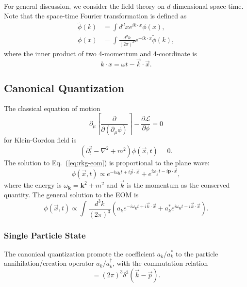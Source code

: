 For general discussion, we consider the field theory on $d$-dimensional space-time.
Note that the space-time Fourier transformation is defined as
\begin{equation}
\begin{aligned}
	\tilde{\phi}(k) &= \int d^{d}x e^{ik\cdot x} \phi(x), \\ 
	\phi(x) &= \int \frac{d^{d}k}{(2\pi)^{d}} e^{-ik\cdot x}\tilde{\phi}(k),
\end{aligned}
\end{equation}
where the inner product of two 4-momentum and 4-coordinate is
\begin{equation}
	k\cdot x=\omega t-\vec k\cdot \vec x.
\end{equation}


\subsection{Canonical Quantization}
The classical equation of motion 
\begin{equation*}
	\partial_\mu \left[\frac{\partial}{\partial(\partial_\mu \phi)}\right] - \frac{\partial \mathcal L}{\partial \phi} = 0
\end{equation*}
for Klein-Gordon field is 
\begin{equation}
	(\partial_t^2-\nabla^2+m^2)\phi(\vec x,t) = 0. 
	\label{eq:rkg-eom}
\end{equation}
The solution to Eq.~(\ref{eq:rkg-eom}) is proportional to the plane wave:
\begin{equation*}
	\phi(\vec x, t) \propto e^{-i\omega_{\bm{k}}t+i\vec{p}\cdot\vec{x}} + e^{i\omega_{\vec{k}}t-i\bm{p}\cdot\vec{x}},
\end{equation*}
where the energy is $\omega_{\bm{k}}=\bm{k}^2+m^2$ and $\vec k$ is the momentum as the conserved quantity.
The general solution to the EOM is
\begin{equation}
	\phi(\vec x,t) \propto \int \frac{d^{3} k}{(2\pi)^{3}} \left(
		a_{k}e^{-i\omega_{\bm{k}}t+i\vec{k}\cdot\vec{x}} + 
		a^*_{k}e^{i\omega_{\bm{k}}t-i\vec{k}\cdot\vec{x}} 
	\right).
\end{equation}

\subsubsection{Single Particle State}
The canonical quantization promote the coefficient $a_{k}/a_{k}^*$ to the particle annihilation/creation operator $a_{k}/a_{k}^\dagger$, with the commutation relation
\begin{equation}
	[a_{k}, a_{p}^\dagger] = (2\pi)^{3} \delta^{3}(\vec{k}-\vec{p}).
\end{equation}

